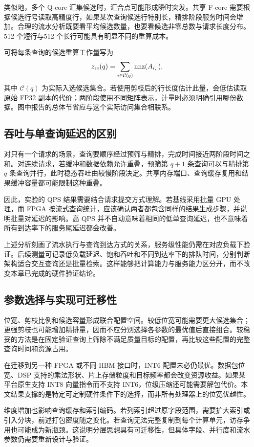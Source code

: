 类似地，多个 Q-core 汇集候选时，汇合点可能形成瞬时突发。共享 F-core 需要根据候选行号读取高精度行，如果某次查询候选行特别长，精排阶段服务时间会增加。合理的流水分析既要看平均候选数量，也要看候选非零总数与请求长度分布。512 个短行与512 个长行可能具有明显不同的重算成本。

可将每条查询的候选重算工作量写为
\begin{equation}
 z_{\mathrm{re}}(q)=\sum_{i\in\mathcal C(q)}\operatorname{nnz}(A_{i,:}),
\end{equation}
其中 $\mathcal C(q)$ 为实际入选候选集合。若使用剪枝后的行长度估计此量，会低估读取原始 FP32 副本的代价；两阶段使用不同矩阵表示，计量时必须明确引用哪份数据。图中报告的总体节省应与这个实际访问集合相联系。

\subsection{吞吐与单查询延迟的区别}
对只有一个请求的场景，查询要顺序经过预筛与精排，完成时间接近两阶段时间之和。对连续请求，若缓冲和数据依赖允许重叠，预筛第 $q+1$ 条查询可以与精排第 $q$ 条查询并行，此时稳态吞吐由较慢阶段决定。共享内存端口、查询缓存复用和结果缓冲容量都可能限制这种重叠。

因此，实验的 QPS 结果需要结合请求提交方式理解。若基线采用批量 GPU 处理，而 FPGA 按流式查询统计，应该确认两者都包含同样的结果生成步骤，并说明批量对延迟的影响。高 QPS 并不自动意味着相同的低单查询延迟，也不意味着所有到达率下的服务尾延迟都会改善。

上述分析刻画了流水执行与查询到达方式的关系，服务级性能仍需在对应负载下验证。后续测量可记录低负载延迟、饱和吞吐和不同到达率下的排队时间，分别判断架构适合交互查询还是批量检索。这样能够把计算能力与服务能力区分开，而不改变本章已完成的硬件验证结论。

\subsection{参数选择与实现可迁移性}
位宽、剪枝比例和候选容量形成联合配置空间。较低位宽可能需要更大候选集合；更强剪枝也可能增加精排量，因而不应分别选择各参数的最优值后直接组合。较稳妥的方法是在固定验证查询上筛除不满足质量目标的配置，再比较这些配置的完整查询时间和资源占用。

在迁移到另一种 FPGA 或不同 HBM 接口时，INT6 配置未必仍最优。数据包位宽、DSP 支持的乘法形状、片上存储粒度和目标频率都会改变资源收益。如果某平台原生支持 INT8 向量指令而不支持 INT6，位级压缩还可能需要解包代价。本文结果支撑的是特定可定制硬件条件下的选择，而非所有处理器上的位宽优越性。

维度增加也影响查询缓存和索引编码。若列索引超过原字段范围，需要扩大索引或引入分块，前述打包密度随之变化。若查询无法完整复制到每个计算单元，访存争用也可能成为新瓶颈。这说明分层思想具有可迁移性，但具体字段、并行度和流水参数仍需要重新设计与验证。
